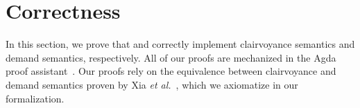 \section{Correctness}\label{sec:equiv}

In this section, we prove that \transCname{} and \transDname{} correctly
implement clairvoyance semantics and demand semantics, respectively. All of our
proofs are mechanized in the Agda proof
assistant~\cite{DBLP:conf/tldi/Norell09}. Our proofs rely on the equivalence
between clairvoyance and demand semantics proven by Xia \textit{et
  al.}~\cite[Section 3.3]{demand-semantics}, which we axiomatize in our
formalization.



